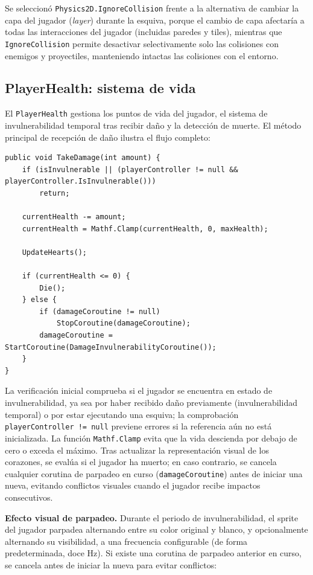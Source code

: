 Se seleccionó \texttt{Physics2D.IgnoreCollision} frente a la alternativa de cambiar la capa del jugador (\textit{layer}) durante la esquiva, porque el cambio de capa afectaría a todas las interacciones del jugador (incluidas paredes y tiles), mientras que \texttt{IgnoreCollision} permite desactivar selectivamente solo las colisiones con enemigos y proyectiles, manteniendo intactas las colisiones con el entorno.

\subsection{PlayerHealth: sistema de vida}


El \texttt{PlayerHealth} gestiona los puntos de vida del jugador, el sistema de invulnerabilidad temporal tras recibir daño y la detección de muerte. El método principal de recepción de daño ilustra el flujo completo:

\begin{lstlisting}
public void TakeDamage(int amount) {
    if (isInvulnerable || (playerController != null && playerController.IsInvulnerable()))
        return;
    
    currentHealth -= amount;
    currentHealth = Mathf.Clamp(currentHealth, 0, maxHealth);
    
    UpdateHearts();
    
    if (currentHealth <= 0) {
        Die();
    } else {
        if (damageCoroutine != null)
            StopCoroutine(damageCoroutine);
        damageCoroutine = StartCoroutine(DamageInvulnerabilityCoroutine());
    }
}
\end{lstlisting}


La verificación inicial comprueba si el jugador se encuentra en estado de invulnerabilidad, ya sea por haber recibido daño previamente (invulnerabilidad temporal) o por estar ejecutando una esquiva; la comprobación \texttt{playerController != null} previene errores si la referencia aún no está inicializada. La función \texttt{Mathf.Clamp} evita que la vida descienda por debajo de cero o exceda el máximo. Tras actualizar la representación visual de los corazones, se evalúa si el jugador ha muerto; en caso contrario, se cancela cualquier corutina de parpadeo en curso (\texttt{damageCoroutine}) antes de iniciar una nueva, evitando conflictos visuales cuando el jugador recibe impactos consecutivos.

\textbf{Efecto visual de parpadeo.} Durante el periodo de invulnerabilidad, el sprite del jugador parpadea alternando entre su color original y blanco, y opcionalmente alternando su visibilidad, a una frecuencia configurable (de forma predeterminada, doce Hz). Si existe una corutina de parpadeo anterior en curso, se cancela antes de iniciar la nueva para evitar conflictos:

